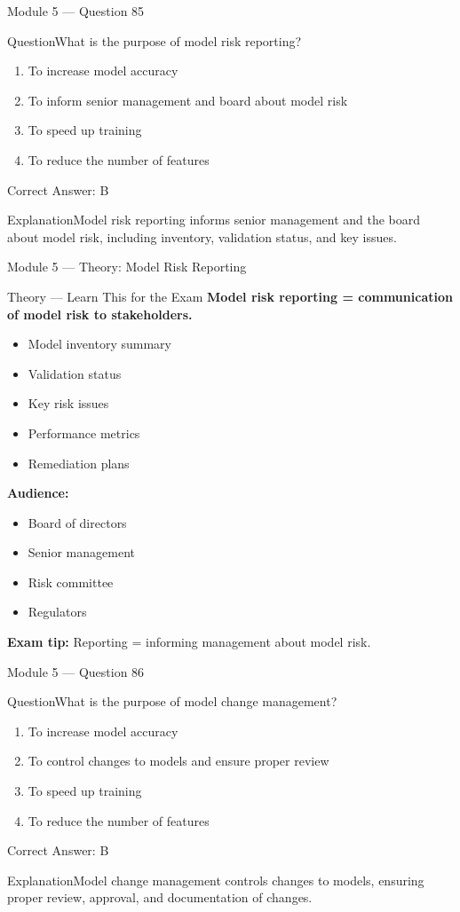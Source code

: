 \documentclass[aspectratio=169,10pt]{beamer}
\newcommand{\question}[1]{\begin{block}{Question}#1\end{block}}
\newcommand{\options}[4]{%
	\begin{enumerate}[label=\Alph*.,leftmargin=*]
		\item #1
		\item #2
		\item #3
		\item #4
	\end{enumerate}
}
\newcommand{\answerbox}[1]{\begin{exampleblock}{Correct Answer: #1}\end{exampleblock}}
\newcommand{\explain}[1]{\begin{block}{Explanation}#1\end{block}}
\newcommand{\theory}[1]{%
	\begin{block}{Theory --- Learn This for the Exam}
		\small #1
	\end{block}
}
\begin{document}
	\begin{frame}{Module 5 --- Question 85}
		\question{What is the purpose of model risk reporting?}
		\options{To increase model accuracy}{To inform senior management and board about model risk}{To speed up training}{To reduce the number of features}
		\answerbox{B}
		\explain{Model risk reporting informs senior management and the board about model risk, including inventory, validation status, and key issues.}
	\end{frame}
	
	\begin{frame}{Module 5 --- Theory: Model Risk Reporting}
		\theory{
			\textbf{Model risk reporting = communication of model risk to stakeholders.}
			\begin{itemize}
				\item Model inventory summary
				\item Validation status
				\item Key risk issues
				\item Performance metrics
				\item Remediation plans
			\end{itemize}
			\textbf{Audience:}
			\begin{itemize}
				\item Board of directors
				\item Senior management
				\item Risk committee
				\item Regulators
			\end{itemize}
			\textbf{Exam tip:} Reporting = informing management about model risk.
		}
	\end{frame}
	
	\begin{frame}{Module 5 --- Question 86}
		\question{What is the purpose of model change management?}
		\options{To increase model accuracy}{To control changes to models and ensure proper review}{To speed up training}{To reduce the number of features}
		\answerbox{B}
		\explain{Model change management controls changes to models, ensuring proper review, approval, and documentation of changes.}
	\end{frame}
	
\end{document}
